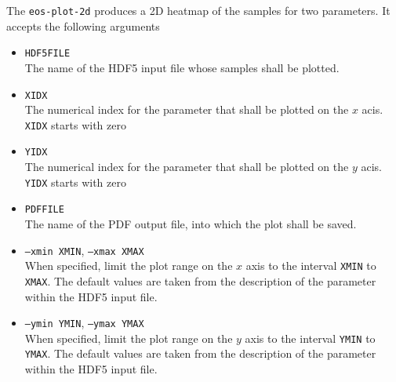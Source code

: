 The \texttt{eos-plot-2d} produces a 2D heatmap of the samples for two parameters.
It accepts the following arguments
\begin{itemize}
    \item[] \texttt{HDF5FILE}\\[\medskipamount]
        The name of the HDF5 input file whose samples shall be plotted.

    \item[] \texttt{XIDX}\\[\medskipamount]
        The numerical index for the parameter that shall be plotted on the
        $x$ acis. \texttt{XIDX} starts with zero

    \item[] \texttt{YIDX}\\[\medskipamount]
        The numerical index for the parameter that shall be plotted on the
        $y$ acis. \texttt{YIDX} starts with zero

    \item[] \texttt{PDFFILE}\\[\medskipamount]
        The name of the PDF output file, into which the plot shall be saved.

    \item[] \texttt{--xmin XMIN}, \texttt{--xmax XMAX}\\[\medskipamount]
        When specified, limit the plot range on the $x$ axis to the interval
        \texttt{XMIN} to \texttt{XMAX}. The default values are taken from the
        description of the parameter within the HDF5 input file.

    \item[] \texttt{--ymin YMIN}, \texttt{--ymax YMAX}\\[\medskipamount]
        When specified, limit the plot range on the $y$ axis to the interval
        \texttt{YMIN} to \texttt{YMAX}. The default values are taken from the
        description of the parameter within the HDF5 input file.
\end{itemize}

